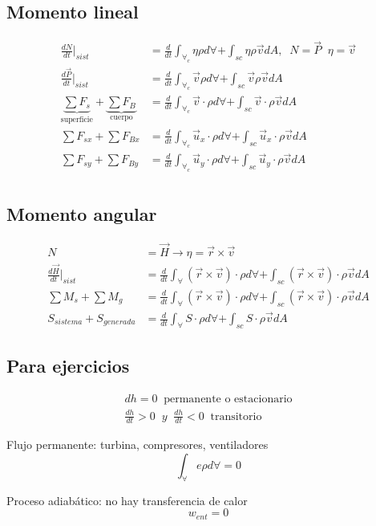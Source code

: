\subsection{Momento lineal}
\[
    \begin{split}
        \frac{ dN }{ dt }\Big|_{sist} & = \frac{ d }{ dt } \int_{ \forall_{c} } \eta \rho d\forall + \int_{sc} \eta \rho \Vec{v} dA, \;\; N = \Vec{P} \;\; \eta = \Vec{v} \\
        \frac{ d\Vec{P} }{ dt }\Big|_{sist} & = \frac{ d }{ dt } \int_{ \forall_{c} } \Vec{v} \rho d\forall + \int_{sc} \Vec{v} \rho \Vec{v} dA \\
        \underbrace{ \sum F_{s} }_{ \text{superficie} } + \underbrace{ \sum F_{B} }_{ \text{cuerpo} } & = \frac{ d }{ dt } \int_{ \forall_{c} } \Vec{v} \cdot \rho d\forall + \int_{sc} \Vec{v} \cdot \rho \Vec{v} dA \\
        \sum F_{sx} + \sum F_{Bx} & = \frac{ d }{ dt } \int_{\forall_{c}} \Vec{u}_{x} \cdot \rho d\forall + \int_{sc} \Vec{u}_{x} \cdot \rho \Vec{v} dA \\
        \sum F_{sy} + \sum F_{By} & = \frac{ d }{ dt } \int_{\forall_{c}} \Vec{u}_{y} \cdot \rho d\forall + \int_{sc} \Vec{u}_{y} \cdot \rho \Vec{v} dA \\
    \end{split}
\]

\subsection{Momento angular}

\[
    \begin{split}
        N & = \Vec{ H } \to  \eta = \Vec{ r } \times \Vec{ v } \\
        \frac{ d\Vec{ H } }{ dt } \Big|_{sist} & = \frac{ d }{ dt } \int_{ \forall } (\Vec{r} \times \Vec{v} ) \cdot \rho d\forall + \int_{sc} (\Vec{r} \times \Vec{v} ) \cdot \rho \Vec{v} dA \\
        \sum M_{s} + \sum M_{g} & = \frac{ d }{ dt } \int_{ \forall } (\Vec{r} \times \Vec{v} ) \cdot \rho d\forall + \int_{sc} (\Vec{r} \times \Vec{v} ) \cdot \rho \Vec{v} dA \\
        S_{sistema} + S_{generada} & = \frac{ d }{ dt } \int_{ \forall } S \cdot \rho d\forall + \int_{sc} S \cdot \rho \Vec{v} dA
    \end{split}
\]

\subsection{Para ejercicios}

\[
    \begin{split}
        dh = 0 \;\; \text{permanente o estacionario} \\
        \frac{ dh }{ dt } > 0 \;\; y \;\; \frac{ dh }{ dt } < 0 \;\; \text{transitorio}
    \end{split}
\]

Flujo permanente: turbina, compresores, ventiladores
\[
    \int_{ \forall } e \rho d\forall = 0
\]

Proceso adiabático: no hay transferencia de calor
\[
    w_{ent} = 0
\]